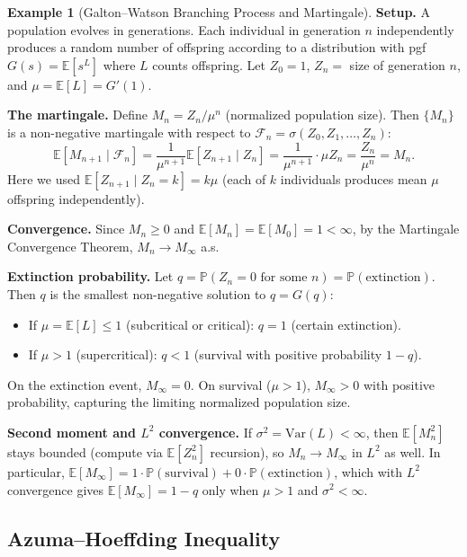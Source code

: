 \documentclass[12pt, a4paper]{article}
\theoremstyle{definition}
\newtheorem{example}{Example}[section]
\theoremstyle{plain}
\newcommand{\PP}{\mathbb{P}}
\newcommand{\EE}{\mathbb{E}}
\begin{document}
\begin{example}[Galton--Watson Branching Process and Martingale]
\label{ex:galton-watson}
\textbf{Setup.} A population evolves in generations. Each individual in generation $n$ independently produces a random number of offspring according to a distribution with pgf $G(s) = \EE[s^L]$ where $L$ counts offspring. Let $Z_0 = 1$, $Z_n = $ size of generation $n$, and $\mu = \EE[L] = G'(1)$.

\textbf{The martingale.} Define $M_n = Z_n / \mu^n$ (normalized population size). Then $\{M_n\}$ is a non-negative martingale with respect to $\mathcal{F}_n = \sigma(Z_0, Z_1, \ldots, Z_n)$:
\[
  \EE[M_{n+1} \mid \mathcal{F}_n] = \frac{1}{\mu^{n+1}} \EE[Z_{n+1} \mid Z_n] = \frac{1}{\mu^{n+1}} \cdot \mu Z_n = \frac{Z_n}{\mu^n} = M_n.
\]
Here we used $\EE[Z_{n+1} \mid Z_n = k] = k\mu$ (each of $k$ individuals produces mean $\mu$ offspring independently).

\textbf{Convergence.} Since $M_n \ge 0$ and $\EE[M_n] = \EE[M_0] = 1 < \infty$, by the Martingale Convergence Theorem, $M_n \to M_\infty$ a.s.

\textbf{Extinction probability.} Let $q = \PP(Z_n = 0 \text{ for some } n) = \PP(\text{extinction})$. Then $q$ is the smallest non-negative solution to $q = G(q)$:
\begin{itemize}
  \item If $\mu = \EE[L] \le 1$ (subcritical or critical): $q = 1$ (certain extinction).
  \item If $\mu > 1$ (supercritical): $q < 1$ (survival with positive probability $1-q$).
\end{itemize}
On the extinction event, $M_\infty = 0$. On survival ($\mu > 1$), $M_\infty > 0$ with positive probability, capturing the limiting normalized population size.

\textbf{Second moment and $L^2$ convergence.} If $\sigma^2 = \text{Var}(L) < \infty$, then $\EE[M_n^2]$ stays bounded (compute via $\EE[Z_n^2]$ recursion), so $M_n \to M_\infty$ in $L^2$ as well. In particular, $\EE[M_\infty] = 1 \cdot \PP(\text{survival}) + 0 \cdot \PP(\text{extinction})$, which with $L^2$ convergence gives $\EE[M_\infty] = 1-q$ only when $\mu > 1$ and $\sigma^2 < \infty$.
\end{example}

\subsection{Azuma--Hoeffding Inequality}
\end{document}
